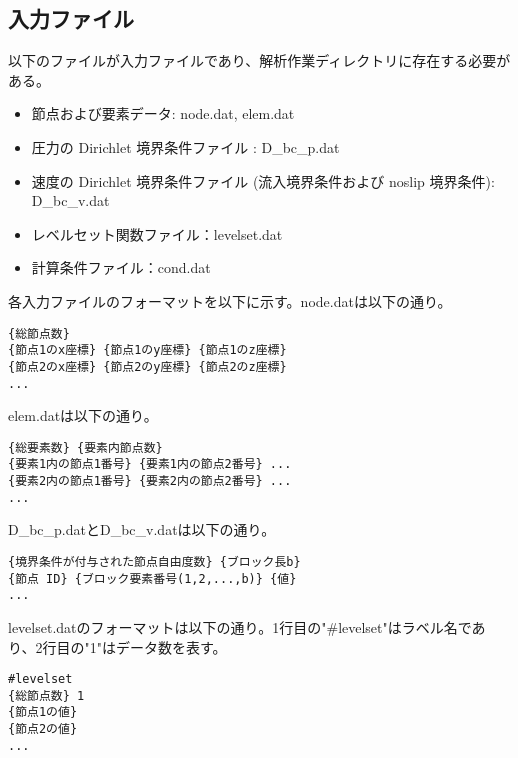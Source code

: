 \subsection{入力ファイル}
以下のファイルが入力ファイルであり、解析作業ディレクトリに存在する必要がある。
\begin{itemize}
	\item 節点および要素データ: node.dat, elem.dat
	\item 圧力の Dirichlet 境界条件ファイル : D\_bc\_p.dat
	\item 速度の Dirichlet 境界条件ファイル (流入境界条件および noslip 境界条件): D\_bc\_v.dat
	\item レベルセット関数ファイル：levelset.dat
	\item 計算条件ファイル：cond.dat
\end{itemize}

各入力ファイルのフォーマットを以下に示す。node.datは以下の通り。
\begin{lstlisting}[]
{総節点数}
{節点1のx座標} {節点1のy座標} {節点1のz座標}
{節点2のx座標} {節点2のy座標} {節点2のz座標}
...
\end{lstlisting}

elem.datは以下の通り。
\begin{lstlisting}[]
{総要素数} {要素内節点数}
{要素1内の節点1番号} {要素1内の節点2番号} ...
{要素2内の節点1番号} {要素2内の節点2番号} ...
...
\end{lstlisting}

D\_bc\_p.datとD\_bc\_v.datは以下の通り。
\begin{lstlisting}[]
{境界条件が付与された節点自由度数} {ブロック長b}
{節点 ID} {ブロック要素番号(1,2,...,b)} {値}
...
\end{lstlisting}

levelset.datのフォーマットは以下の通り。1行目の"\#levelset"はラベル名であり、2行目の"1"はデータ数を表す。
\begin{lstlisting}[]
#levelset
{総節点数} 1
{節点1の値}
{節点2の値}
...
\end{lstlisting}



